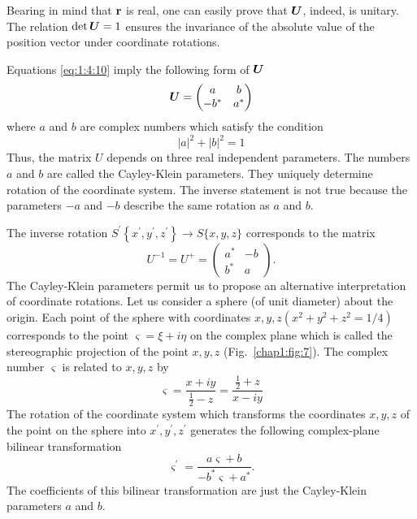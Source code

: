 Bearing in mind that \(\mathbf{r}\) is real, one can easily prove that \(\boldsymbol{U}\), indeed, is unitary. The relation \(\det \boldsymbol{U}=1\) ensures the invariance of the absolute value of the position vector under coordinate rotations.

Equations \eqref{eq:1:4:10} imply the following form of \(\boldsymbol{U}\)
\begin{equation}
\boldsymbol{U}=\begin{pmatrix}
a & b  \label{eq:1:4:11}\\
-b^{*} & a^{*}
\end{pmatrix}
\end{equation}
where \(a\) and \(b\) are complex numbers which satisfy the condition
\begin{equation}
|a|^{2}+|b|^{2}=1 \label{eq:1:4:12}
\end{equation}
Thus, the matrix \(U\) depends on three real independent parameters. The numbers \(a\) and \(b\) are called the Cayley-Klein parameters. They uniquely determine rotation of the coordinate system. The inverse statement is not true because the parameters \(-a\) and \(-b\) describe the same rotation as \(a\) and \(b\).

The inverse rotation \(S^{\prime}\left\{x^{\prime}, y^{\prime}, z^{\prime}\right\} \rightarrow S\{x, y, z\}\) corresponds to the matrix
\begin{equation}
U^{-1}=U^{+}=\begin{pmatrix}
a^{*} & -b  \label{eq:1:4:13}\\
b^{*} & a
\end{pmatrix}.
\end{equation}
The Cayley-Klein parameters permit us to propose an alternative interpretation of coordinate rotations. Let us consider a sphere (of unit diameter) about the origin. Each point of the sphere with coordinates \(x, y, z\left(x^{2}+y^{2}+z^{2}=1 / 4\right)\) corresponds to the point \(\varsigma=\xi+i \eta\) on the complex plane which is called the stereographic projection of the point \(x, y, z\) (Fig.~\ref{chap1:fig:7}). The complex number \(\varsigma\) is related to \(x, y, z\) by
\begin{equation}
\varsigma=\frac{x+i y}{\frac{1}{2}-z}=\frac{\frac{1}{2}+z}{x-i y} \label{eq:1:4:14}
\end{equation}
The rotation of the coordinate system which transforms the coordinates \(x, y, z\) of the point on the sphere into \(x^{\prime}, y^{\prime}, z^{\prime}\) generates the following complex-plane bilinear transformation
\begin{equation}
\varsigma^{\prime}=\frac{a \varsigma+b}{-b^{*} \varsigma+a^{*}} .\label{eq:1:4:15}
\end{equation}
The coefficients of this bilinear transformation are just the Cayley-Klein parameters \(a\) and \(b\).

